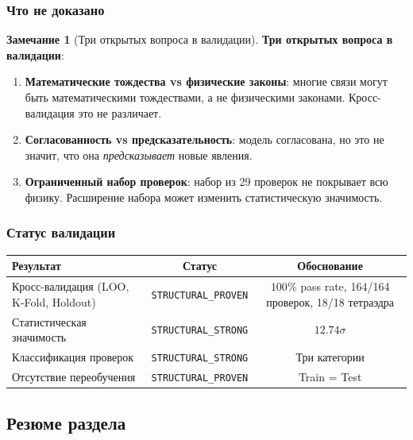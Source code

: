 \documentclass[11pt,a4paper]{article}
\theoremstyle{definition}
\newtheorem{remark}[theorem]{Замечание}
\begin{document}
\subsubsection{Что не доказано}

\begin{remark}[Три открытых вопроса в валидации]
\label{rem:validation-open}
\textbf{Три открытых вопроса в валидации}:
\begin{enumerate}
    \item \textbf{Математические тождества vs физические законы}:
          многие связи могут быть математическими тождествами,
          а не физическими законами. Кросс-валидация это
          не различает.
    \item \textbf{Согласованность vs предсказательность}:
          модель согласована, но это не значит, что она
          \emph{предсказывает} новые явления.
    \item \textbf{Ограниченный набор проверок}: набор из 29
          проверок не покрывает всю физику. Расширение
          набора может изменить статистическую значимость.
\end{enumerate}
\end{remark}

\subsubsection{Статус валидации}

\begin{center}
\begin{tabular}{lcc}
\toprule
Результат & Статус & Обоснование \\
\midrule
Кросс-валидация (LOO, K-Fold, Holdout) & \texttt{STRUCTURAL\_PROVEN} &
$100\%$ pass rate, 164/164 проверок, 18/18 тетраэдра \\
Статистическая значимость & \texttt{STRUCTURAL\_STRONG} &
$12.74\sigma$ \\
Классификация проверок & \texttt{STRUCTURAL\_STRONG} &
Три категории \\
Отсутствие переобучения & \texttt{STRUCTURAL\_PROVEN} &
Train = Test \\
\bottomrule
\end{tabular}
\end{center}

\subsection{Резюме раздела}
\label{subsec:cv-summary}
\end{document}
